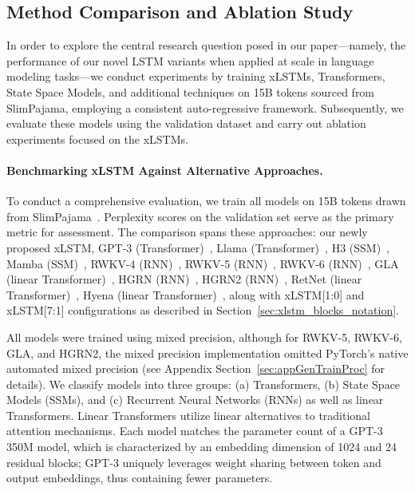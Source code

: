 \subsection{Method Comparison and Ablation Study}
\label{sec:ExpComparison}

In order to explore the central research question posed in our paper—namely, the performance of our novel LSTM variants when applied at scale in language modeling tasks—we conduct experiments by training xLSTMs, Transformers, State Space Models, and additional techniques on 15B tokens sourced from SlimPajama, employing a consistent auto-regressive framework. Subsequently, we evaluate these models using the validation dataset and carry out ablation experiments focused on the xLSTMs.

\paragraph{Benchmarking xLSTM Against Alternative Approaches.} To conduct a comprehensive evaluation, we train all models on 15B tokens drawn from SlimPajama~\citep{Soboleva:23}. Perplexity scores on the validation set serve as the primary metric for assessment. The comparison spans these approaches: our newly proposed xLSTM, GPT-3 (Transformer)~\citep{Brown:20short}, Llama (Transformer)~\citep{Touvron:23arxiv}, H3 (SSM)~\citep{Fu:23}, Mamba (SSM)~\citep{Gu:24arxiv}, RWKV-4 (RNN)~\citep{Peng:23arxivshort}, RWKV-5 (RNN)~\citep{Peng:24arxivshort}, RWKV-6 (RNN)~\citep{Peng:24arxivshort}, GLA (linear Transformer)~\citep{Yang:23arxiv}, HGRN (RNN)~\citep{Qin:23}, HGRN2 (RNN)~\citep{Qin:24arxiv}, RetNet (linear Transformer)~\citep{Sun:23arxiv}, Hyena (linear Transformer)~\citep{Poli:23}, along with xLSTM[1:0] and xLSTM[7:1] configurations as described in Section~\ref{sec:xlstm_blocks_notation}. 

All models were trained using mixed precision, although for RWKV-5, RWKV-6, GLA, and HGRN2, the mixed precision implementation omitted PyTorch's native automated mixed precision (see Appendix Section~\ref{sec:appGenTrainProc} for details). We classify models into three groups: (a) Transformers, (b) State Space Models (SSMs), and (c) Recurrent Neural Networks (RNNs) as well as linear Transformers. Linear Transformers utilize linear alternatives to traditional attention mechanisms. Each model matches the parameter count of a GPT-3 350M model, which is characterized by an embedding dimension of 1024 and 24 residual blocks; GPT-3 uniquely leverages weight sharing between token and output embeddings, thus containing fewer parameters. 

